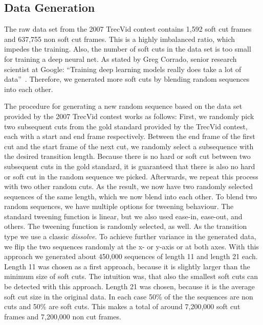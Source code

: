 \subsection{Data Generation}
\label{sec:soft_cut_data_generation}

The raw data set from the 2007 TrecVid contest contains 1,592 soft cut frames and 637,755 non soft cut frames.
This is a highly imbalanced ratio, which impedes the training.
Also, the number of soft cuts in the data set is too small for training a deep neural net.
As stated by Greg Corrado, senior research scientist at Google: ``Training deep learning models really does take a lot of data''~\cite{dataDeepNeuralNets}.
Therefore, we generated more soft cuts by blending random sequences into each other.

The procedure for generating a new random sequence based on the data set provided by the 2007 TrecVid contest works as follows:
First, we randomly pick two subsequent cuts from the gold standard provided by the TrecVid contest, each with a start and end frame respectively.
Between the end frame of the first cut and the start frame of the next cut, we randomly select a subsequence with the desired transition length.
Because there is no hard or soft cut between two subsequent cuts in the gold standard, it is guaranteed that there is also no hard or soft cut in the random sequence we picked.
Afterwards, we repeat this process with two other random cuts.
As the result, we now have two randomly selected sequences of the same length, which we now blend into each other.
To blend two random sequences, we have multiple options for tweening behaviour.
The standard tweening function is linear, but we also used ease-in, ease-out, and others.
The tweening function is randomly selected, as well.
As the transition type we use a classic \textit{dissolve}.
To achieve further variance in the generated data, we flip the two sequences randomly at the x- or y-axis or at both axes.
With this approach we generated about 450,000 sequences of length 11 and length 21 each.
Length 11 was chosen as a first approach, because it is slightly larger than the minimum size of soft cuts.
The intuition was, that also the smallest soft cuts can be detected with this approach.
Length 21 was chosen, because it is the average soft cut size in the original data.
In each case 50\% of the the sequences are non cuts and 50\% are soft cuts.
This makes a total of around 7,200,000 soft cut frames and 7,200,000 non cut frames.
